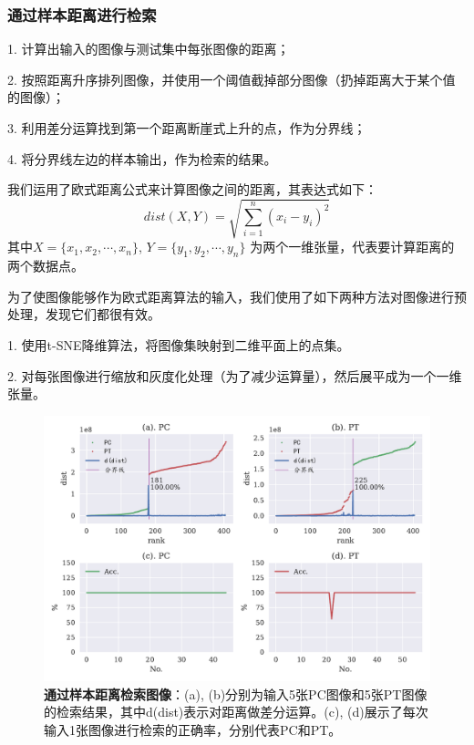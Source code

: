 \subsubsection{通过样本距离进行检索}
1. 计算出输入的图像与测试集中每张图像的距离；

2. 按照距离升序排列图像，并使用一个阈值截掉部分图像（扔掉距离大于某个值的图像）；

3. 利用差分运算找到第一个距离断崖式上升的点，作为{\Heiti 分界线}；

4. 将分界线左边的样本输出，作为检索的结果。

我们运用了欧式距离公式来计算图像之间的距离，其表达式如下：
\begin{equation}\label{equ:EuclideanDistance}
dist(X, Y) = \sqrt{\sum\limits_{i=1}^{n} (x_i - y_i)^2}
\end{equation}
其中$X = \{x_1, x_2, \cdots, x_n\}$, $Y = \{y_1, y_2, \cdots, y_n\}$ 为两个一维张量，代表要计算距离的两个数据点。

为了使图像能够作为欧式距离算法的输入，我们使用了如下两种方法对图像进行预处理，发现它们都很有效。

1. 使用t-SNE降维算法，将图像集映射到二维平面上的点集。

2. 对每张图像进行缩放和灰度化处理（为了减少运算量），然后展平成为一个一维张量。

\begin{figure}[H]
	\centering
	\includegraphics[width=\linewidth]{../figures/retrieval/TSNE-dist2.pdf}
	\caption{\textbf{通过样本距离检索图像}：(a), (b)分别为输入5张PC图像和5张PT图像的检索结果，其中d(dist)表示对距离做差分运算。(c), (d)展示了每次输入1张图像进行检索的正确率，分别代表PC和PT。}
	\label{fig:o1}
\end{figure}



